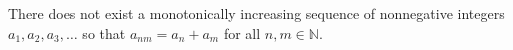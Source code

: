 There does not exist a monotonically increasing sequence of nonnegative integers $a_1, a_2, a_3, \ldots$ so that $a_{nm} = a_n + a_m$ for all $n, m \in \mathbb{N}$.
